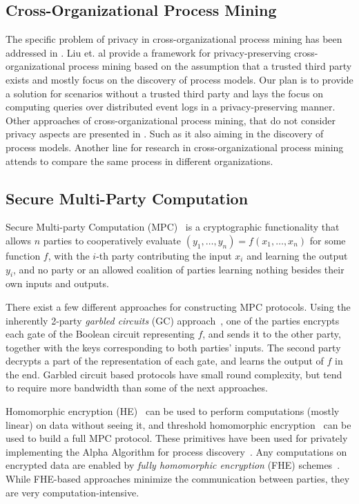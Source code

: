  \subsection{Cross-Organizational Process Mining}
 \label{sec:cross_orgranizational}
The specific problem of privacy in cross-organizational process mining has been addressed in \cite{Liu19}. Liu et. al provide a framework for privacy-preserving cross-organizational process mining based on the assumption that a trusted third party exists and mostly focus on the discovery of process models. Our plan is to provide a solution for scenarios without a trusted third party and lays the focus on computing queries over distributed event logs in a privacy-preserving manner. Other approaches of cross-organizational process mining, that do not consider privacy aspects are presented in \cite{schulz2004facilitating,zeng2013cross}. Such as \cite{Liu19} it also aiming in the discovery of process models.
Another line for research\cite{aksu2016cross,buijs2011towards,van2010configurable} in cross-organizational process mining attends to compare the same process in different organizations.

 \subsection{Secure Multi-Party Computation}
 \label{sec:mpc}

 Secure Multi-party Computation (MPC)~\cite{GMW} is a cryptographic functionality that allows $n$ parties to cooperatively evaluate $(y_1,\ldots,y_n)=f(x_1,\ldots,x_n)$ for some function $f$, with the $i$-th party contributing the input $x_i$ and learning the output $y_i$, and no party or an allowed coalition of parties learning nothing besides their own inputs and outputs.
 
There exist a few different approaches for constructing MPC protocols. Using the inherently 2-party \emph{garbled circuits} (GC) approach~\cite{yao1982protocols,yao1986generate}, one of the parties encrypts each gate of the Boolean circuit representing $f$, and sends it to the other party, together with the keys corresponding to both parties' inputs. The second party decrypts a part of the representation of each gate, and learns the output of $f$ in the end. Garbled circuit based protocols have small round complexity, but tend to require more bandwidth than some of the next approaches.

Homomorphic encryption (HE)~\cite{elgamal1985public,paillier1999public} can be used to perform computations (mostly linear) on data without seeing it, and threshold homomorphic encryption~\cite{DBLP:conf/eurocrypt/CramerDN01} can be used to build a full MPC protocol. These primitives have been used for privately implementing the Alpha Algorithm for process discovery~\cite{tillem2016privacy,tillem2017mining}. Any computations on encrypted data are enabled by \emph{fully homomorphic encryption} (FHE) schemes~\cite{DBLP:conf/stoc/Gentry09}. While FHE-based approaches minimize the communication between parties, they are very computation-intensive.

